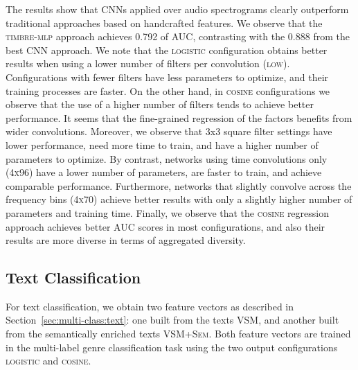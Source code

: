 
The results show that CNNs applied over audio spectrograms clearly outperform traditional approaches based on handcrafted features. 
We observe that the \textsc{timbre-mlp} approach achieves 0.792 of AUC, contrasting with the 0.888 from the best CNN approach.
We note that the \textsc{logistic} configuration obtains better results when using a lower number of filters per convolution (\textsc{low}). Configurations with fewer filters have less parameters to optimize, and their training processes are faster. 
On the other hand, in \textsc{cosine} configurations we observe that the use of a higher number of filters tends to achieve better performance. 
It seems that the fine-grained regression of the factors benefits from wider convolutions.
Moreover, we observe that 3x3 square filter settings have lower performance, need more time to train, and have a higher number of parameters to optimize.
By contrast, networks using time convolutions only (\textsc{4x96}) have a lower number of parameters, are faster to train, and achieve comparable performance. 
Furthermore, networks that slightly convolve across the frequency bins (\textsc{4x70}) achieve better results with only a slightly higher number of parameters and training time. 
Finally, we observe that the \textsc{cosine} regression approach achieves better AUC scores in most configurations, and also their results are more diverse in terms of aggregated diversity.



\subsection{Text Classification}\label{sec:multi-class:textexp}

For text classification, we obtain two feature vectors as described in Section~\ref{sec:multi-class:text}: one built from the texts \textsc{VSM}, and another built from the semantically enriched texts \textsc{VSM+Sem}. 
Both feature vectors are trained in the multi-label genre classification task using the two output configurations \textsc{logistic} and \textsc{cosine}.

